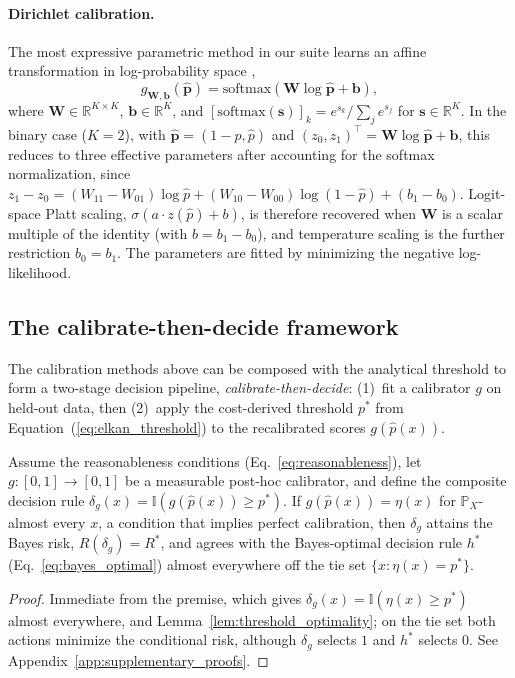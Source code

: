 \paragraph{Dirichlet calibration.} The most expressive parametric method in our suite learns an affine transformation in log-probability space \citep{kull2019beyond},
\begin{equation}\label{eq:dirichlet_calibration}
    g_{\mathbf{W}, \mathbf{b}}(\hat{\mathbf{p}}) = \mathrm{softmax}\!\left(\mathbf{W} \log \hat{\mathbf{p}} + \mathbf{b}\right),
\end{equation}
where $\mathbf{W} \in \mathbb{R}^{K \times K}$, $\mathbf{b} \in \mathbb{R}^K$, and $[\mathrm{softmax}(\mathbf{s})]_k = e^{s_k} / \sum_{j} e^{s_j}$ for $\mathbf{s} \in \mathbb{R}^K$. In the binary case ($K=2$), with $\hat{\mathbf{p}} = (1-\hat p, \hat p)$ and $(z_0, z_1)^\top = \mathbf{W}\log\hat{\mathbf{p}} + \mathbf{b}$, this reduces to three effective parameters after accounting for the softmax normalization, since $z_1 - z_0 = (W_{11} - W_{01}) \log\hat p + (W_{10} - W_{00}) \log(1-\hat p) + (b_1 - b_0)$. Logit-space Platt scaling, $\sigma(a \cdot z(\hat p) + b)$, is therefore recovered when $\mathbf{W}$ is a scalar multiple of the identity (with $b = b_1 - b_0$), and temperature scaling is the further restriction $b_0 = b_1$. The parameters are fitted by minimizing the negative log-likelihood.

\subsection{The calibrate-then-decide framework}

The calibration methods above can be composed with the analytical threshold to form a two-stage decision pipeline, \emph{calibrate-then-decide}: (1)~fit a calibrator $g$ on held-out data, then (2)~apply the cost-derived threshold $p^*$ from Equation~(\ref{eq:elkan_threshold}) to the recalibrated scores $g(\hat{p}(x))$.

\begin{proposition}\label{prop:calibrate_then_decide}
Assume the reasonableness conditions (Eq.~\ref{eq:reasonableness}), let $g: [0,1] \to [0,1]$ be a measurable post-hoc calibrator, and define the composite decision rule $\delta_g(x) = \mathbb{I}(g(\hat{p}(x)) \geq p^*)$. If $g(\hat{p}(x)) = \eta(x)$ for $\mathbb{P}_X$-almost every $x$, a condition that implies perfect calibration, then $\delta_g$ attains the Bayes risk, $R(\delta_g) = R^*$, and agrees with the Bayes-optimal decision rule $h^*$ (Eq.~\ref{eq:bayes_optimal}) almost everywhere off the tie set $\{x : \eta(x) = p^*\}$.
\end{proposition}
\begin{proof}
Immediate from the premise, which gives $\delta_g(x) = \mathbb{I}(\eta(x) \geq p^*)$ almost everywhere, and Lemma~\ref{lem:threshold_optimality}; on the tie set both actions minimize the conditional risk, although $\delta_g$ selects $1$ and $h^*$ selects $0$. See Appendix~\ref{app:supplementary_proofs}.
\end{proof}

